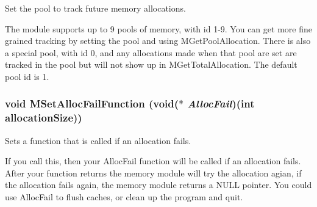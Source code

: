 Set the pool to track future memory allocations. 

The module supports up to 9 pools of memory, with id 1-9. You can get more fine grained tracking by setting the pool and using MGet\-Pool\-Allocation. There is also a special pool, with id 0, and any allocations made when that pool are set are tracked in the pool but will not show up in MGet\-Total\-Allocation. The default pool id is 1. 
\subsubsection{\setlength{\rightskip}{0pt plus 5cm}void MSet\-Alloc\-Fail\-Function (void($\ast$ {\em Alloc\-Fail})(int allocation\-Size))}\label{memory_8h_a10}


Sets a function that is called if an allocation fails. 

If you call this, then your Alloc\-Fail function will be called if an allocation fails. After your function returns the memory module will try the allocation agian, if the allocation fails again, the memory module returns a NULL pointer. You could use Alloc\-Fail to flush caches, or clean up the program and quit. 